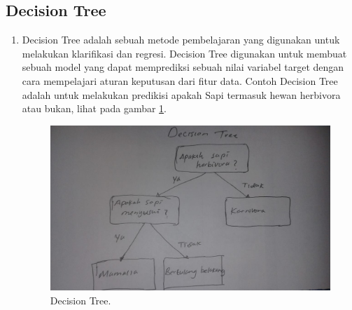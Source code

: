 \subsection{Decision Tree}
\begin{enumerate}
\item Decision Tree adalah sebuah metode pembelajaran yang digunakan untuk melakukan klarifikasi dan regresi. Decision Tree digunakan untuk membuat sebuah model yang dapat memprediksi sebuah nilai variabel target dengan cara mempelajari aturan keputusan dari fitur data. Contoh Decision Tree adalah untuk melakukan predikisi apakah Sapi termasuk hewan herbivora atau bukan, lihat pada gambar \ref{6}.

		\begin{figure}[!hbtp]
		\centerline{\includegraphics[width=1\textwidth]{figures/AIP/6.JPEG}}
		\caption{Decision Tree.}
		\label{6}
		\end{figure}

\end{enumerate}

